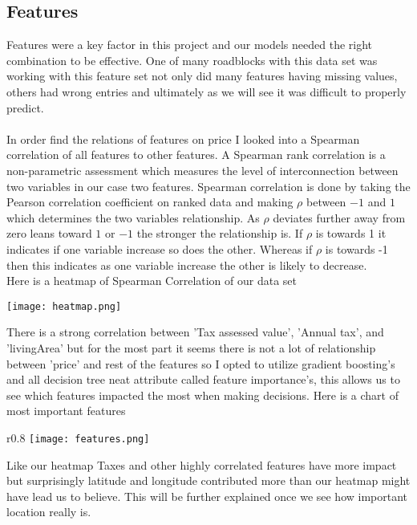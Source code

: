 \documentclass{article}
\begin{document}
\begin{titlepage}
\subsection{Features}
Features were a key factor in this project and our models needed the right combination to be effective. One of many roadblocks with this data set was working with this feature set not only did many features having missing values, others had wrong entries and ultimately as we will see it was difficult to properly predict. \\
\\
In order find the relations of features on price I looked into a Spearman correlation of all features to other features. A Spearman rank correlation is a non-parametric assessment which measures the level of interconnection between two variables in our case two features. Spearman correlation is done by taking the Pearson correlation coefficient on ranked data and making $\rho$ between $-1$ and $1$ which determines the two variables relationship. As $\rho$ deviates further away from zero leans toward $1$ or $-1$ the stronger the relationship is. If $\rho$ is towards 1 it indicates if one variable increase so does the other. Whereas if $\rho$ is towards -1 then this indicates as one variable increase the other is likely to decrease.\\

Here is a heatmap of Spearman Correlation of our data set
    \begin{center}
        \texttt{[image: heatmap.png]}
    \end{center}

There is a strong correlation between 'Tax assessed value', 'Annual tax', and 'livingArea' but for the most part it seems there is not a lot of relationship between 'price' and rest of the features so I opted to utilize gradient boosting's and all decision tree neat attribute called feature importance's, this allows us to see which features impacted the most when making decisions. Here is a chart of most important features

\begin{wrapfigure}{r}{0.8\textwidth}
\texttt{[image: features.png]}
\label{fig:wrapfig}
\end{wrapfigure}
Like our heatmap Taxes and other highly correlated features have more impact but surprisingly latitude and longitude contributed more than our heatmap might have lead us to believe. This will be further explained once we see how important location really is.

\end{titlepage}
\end{document}
